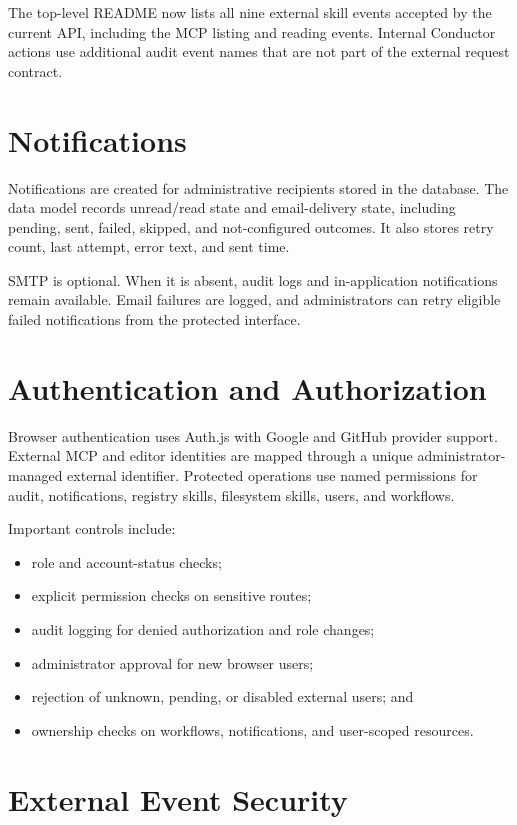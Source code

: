 \documentclass[12pt]{report}
\begin{document}
The top-level README now lists all nine external skill events accepted by the current API, including the MCP listing and reading events. Internal Conductor actions use additional audit event names that are not part of the external request contract.

\section{Notifications}

Notifications are created for administrative recipients stored in the database. The data model records unread/read state and email-delivery state, including pending, sent, failed, skipped, and not-configured outcomes. It also stores retry count, last attempt, error text, and sent time.

SMTP is optional. When it is absent, audit logs and in-application notifications remain available. Email failures are logged, and administrators can retry eligible failed notifications from the protected interface.

\section{Authentication and Authorization}

Browser authentication uses Auth.js with Google and GitHub provider support. External MCP and editor identities are mapped through a unique administrator-managed external identifier. Protected operations use named permissions for audit, notifications, registry skills, filesystem skills, users, and workflows.

Important controls include:

\begin{itemize}
  \item role and account-status checks;
  \item explicit permission checks on sensitive routes;
  \item audit logging for denied authorization and role changes;
  \item administrator approval for new browser users;
  \item rejection of unknown, pending, or disabled external users; and
  \item ownership checks on workflows, notifications, and user-scoped resources.
\end{itemize}

\section{External Event Security}
\end{document}
